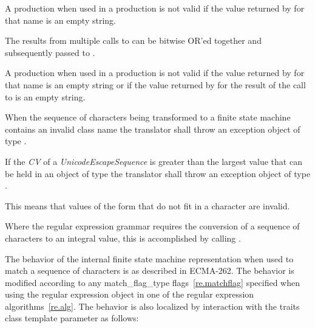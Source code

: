 \pnum
{}%
%
A  production when used in
a  production is not valid 
if the value returned by  for
that name is an empty string. 

\pnum
{}%
%
%
%
The results from multiple calls
to  can be bitwise OR'ed 
together and subsequently passed to .

\pnum
{}%
%
A  production when used in
a  production is not valid if the value
returned by  for that name is an
empty string or if the value returned by  
for the result of the call to 
is an empty string. 

\pnum
{}%
When the sequence of characters being transformed to a finite state
machine contains an invalid class name the translator shall throw an
exception object of type . 

\pnum
{}%
If the \textit{CV} of a \textit{UnicodeEscapeSequence} is greater than the largest
value that can be held in an object of type  the translator shall
throw an exception object of type . \begin{note}
This means that values of the form  that do not fit in
a character are invalid.  \end{note}

\pnum
Where the regular expression grammar requires the conversion of a sequence of characters
to an integral value, this is accomplished by calling .

\pnum
{}%
The behavior of the internal finite state machine representation when used to match a
sequence of characters is as described in ECMA-262.
The behavior is modified according
to any match_flag_type flags~\ref{re.matchflag} specified when using the regular expression
object in one of the regular expression algorithms~\ref{re.alg}. The behavior is also
localized by interaction with the traits class template parameter as follows:


